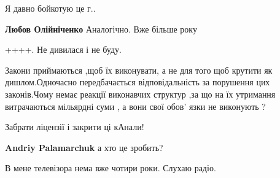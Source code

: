 \begin{itemize}
Я давно бойкотую це г..

 
\textbf{Любов Олійніченко} Аналогічно. Вже більше року

 
++++. Не дивилася і не буду.

 

Закони приймаються ,щоб їх виконувати, а не для того щоб крутити як
дишлом.Одночасно передбачається відповідальність за порушення цих законів.Чому
немає реакції виконавчих структур ,за що на їх утримання витрачаються мільярдні
суми , а вони свої обов' язки не виконують ?


 

Забрати ліцензії і закрити ці кАнали!

 
\textbf{Andriy Palamarchuk} а хто це зробить?

 
В мене телевізора нема вже чотири роки.
Слухаю радіо.

 


\end{itemize}

